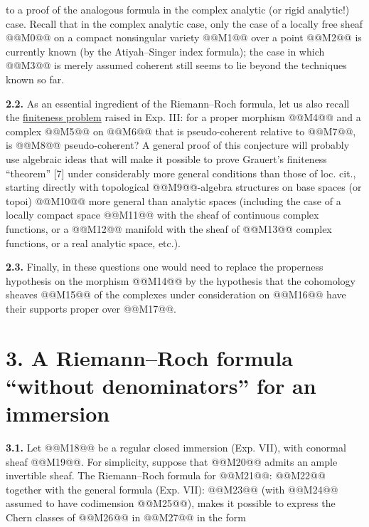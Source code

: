 to a proof of the analogous formula in the complex analytic (or rigid analytic!) case. Recall that in the complex analytic case, only the case of a locally free sheaf @@M0@@ on a compact nonsingular variety @@M1@@ over a point @@M2@@ is currently known (by the Atiyah--Singer index formula); the case in which @@M3@@ is merely assumed coherent still seems to lie beyond the techniques known so far.

\textbf{2.2.} As an essential ingredient of the Riemann--Roch formula, let us also recall the \uline{finiteness problem} raised in Exp. III: for a proper morphism @@M4@@ and a complex @@M5@@ on @@M6@@ that is pseudo-coherent relative to @@M7@@, is @@M8@@ pseudo-coherent? A general proof of this conjecture will probably use algebraic ideas that will make it possible to prove Grauert's finiteness ``theorem'' [7] under considerably more general conditions than those of loc. cit., starting directly with topological @@M9@@-algebra structures on base spaces (or topoi) @@M10@@ more general than analytic spaces (including the case of a locally compact space @@M11@@ with the sheaf of continuous complex functions, or a @@M12@@ manifold with the sheaf of @@M13@@ complex functions, or a real analytic space, etc.).

\textbf{2.3.} Finally, in these questions one would need to replace the properness hypothesis on the morphism @@M14@@ by the hypothesis that the cohomology sheaves @@M15@@ of the complexes under consideration on @@M16@@ have their supports proper over @@M17@@.

\section*{3. A Riemann--Roch formula ``without denominators'' for an immersion}

\textbf{3.1.} Let @@M18@@ be a regular closed immersion (Exp. VII), with conormal sheaf @@M19@@. For simplicity, suppose that @@M20@@ admits an ample invertible sheaf. The Riemann--Roch formula for @@M21@@:
@@M22@@
together with the general formula (Exp. VII):
@@M23@@
(with @@M24@@ assumed to have codimension @@M25@@), makes it possible to express the Chern classes of @@M26@@ in @@M27@@ in the form
